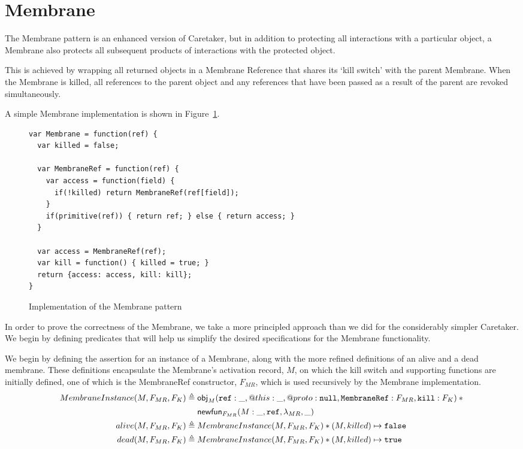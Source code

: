 \documentclass[a4paper,notitlepage]{report}
\begin{document}
\clearpage

\section{Membrane}
\label{sec:membrane}
The Membrane pattern is an enhanced version of Caretaker, but in addition to
protecting all
interactions with a particular object, a Membrane also protects all subsequent
products of interactions with the protected object.

This is achieved by wrapping all returned objects in a Membrane Reference that
shares its `kill switch' with the parent Membrane. When the Membrane is killed,
all references to the parent object and any references that have been passed as
a result of the parent are revoked simultaneously.

A simple Membrane implementation is shown in Figure~\ref{fig:code:membrane}.

\begin{figure}[h!]
\begin{verbatim}var Membrane = function(ref) {
  var killed = false;

  var MembraneRef = function(ref) {
    var access = function(field) {
      if(!killed) return MembraneRef(ref[field]);
    }
    if(primitive(ref)) { return ref; } else { return access; }
  }

  var access = MembraneRef(ref);
  var kill = function() { killed = true; }
  return {access: access, kill: kill};
}\end{verbatim}
  \caption{Implementation of the Membrane pattern}
  \label{fig:code:membrane}
\end{figure}

In order to prove the correctness of the Membrane, we take a more principled
approach than we did for the considerably simpler Caretaker. We begin by
defining predicates that will help us simplify the desired specifications for
the Membrane functionality.

We begin by defining the assertion for an instance of a Membrane, along with the
more refined definitions of an alive and a dead membrane. These definitions
encapsulate the Membrane's activation record, $M$, on which the kill switch and
supporting functions are initially defined, one of which is the MembraneRef
constructor, $F_{MR}$, which is used recursively by the Membrane implementation.
\begin{align*}
  MembraneInstance(M, F_{MR}, F_K) & \triangleq \obj_M(\js{ref}: \_, @this: \_, @proto: \nil,
      \js{MembraneRef}: F_{MR}, \js{kill}: F_{K}) \sep {} \\
      & \phantom{{} \triangleq {}} \newfun_{F_{MR}}(M:\_, \js{ref}, \lambda_{MR}, \_) \\
  alive(M, F_{MR}, F_K) & \triangleq MembraneInstance(M, F_{MR}, F_K) \sep (M, killed) \pointsto \false \\
  dead(M, F_{MR}, F_K) & \triangleq MembraneInstance(M, F_{MR}, F_K) \sep (M, killed) \pointsto \true
\end{align*}
\end{document}
